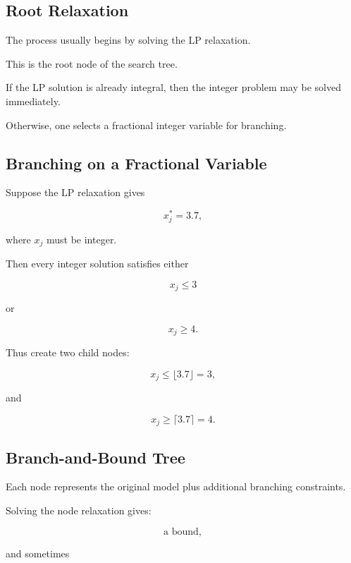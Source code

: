 \subsection{Root Relaxation}
\label{subsec:branch-bound-root}

The process usually begins by solving the LP relaxation.

This is the root node of the search tree.

If the LP solution is already integral, then the integer problem may be
solved immediately.

Otherwise, one selects a fractional integer variable for branching.

\subsection{Branching on a Fractional Variable}
\label{subsec:branching-fractional-variable}

Suppose the LP relaxation gives

\[
\boxed{
x_j^*=3.7,
}
\]

where \(x_j\) must be integer.

Then every integer solution satisfies either

\[
\boxed{
x_j\leq3
}
\]

or

\[
\boxed{
x_j\geq4.
}
\]

Thus create two child nodes:

\[
\boxed{
x_j\leq\lfloor3.7\rfloor=3,
}
\]

and

\[
\boxed{
x_j\geq\lceil3.7\rceil=4.
}
\]

\subsection{Branch-and-Bound Tree}
\label{subsec:branch-and-bound-tree}

Each node represents the original model plus additional branching
constraints.

Solving the node relaxation gives:

\[
\boxed{
\text{a bound},
}
\]

and sometimes

